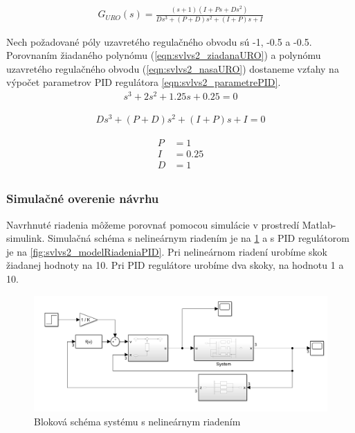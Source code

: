 \documentclass[../main.tex]{subfiles}
\begin{document}
\begin{equation}
		\begin{aligned}
		G_{URO}(s) = \frac{(s+1)(I + Ps + Ds^2)}{Ds^3+(P+D)s^2+(I+P)s+I}
		\end{aligned}
		\label{eqn:svlvs2_prenosUROSystemuLinearizovane}
\end{equation}

Nech požadované póly uzavretého regulačného obvodu sú -1, -0.5 a -0.5. Porovnaním žiadaného polynómu (\cref{eqn:svlvs2_ziadanaURO}) a polynómu uzavretého regulačného obvodu (\cref{eqn:svlvs2_nasaURO}) dostaneme vzťahy na výpočet parametrov PID regulátora \cref{eqn:svlvs2_parametrePID}.
\begin{equation}
		\begin{aligned}
		s^3+2s^2+1.25s+0.25=0
		\end{aligned}
		\label{eqn:svlvs2_ziadanaURO}
	\end{equation}

\begin{equation}
		\begin{aligned}
		Ds^3+(P+D)s^2+(I+P)s+I=0
		\end{aligned}
		\label{eqn:svlvs2_nasaURO}
	\end{equation}

\begin{equation}
		\begin{aligned}
		P &= 1 						\\
		I &= 0.25 						\\
		D &= 1						 \\
		\end{aligned}
		\label{eqn:svlvs2_parametrePID}
	\end{equation}

\newpage
\subsubsection{Simulačné overenie návrhu}

Navrhnuté riadenia môžeme porovnať pomocou simulácie v prostredí Matlab-simulink. Simulačná schéma s nelineárnym riadením je na \cref{fig:svlvs2_modelRiadenia} a s PID regulátorom je na \cref{fig:svlvs2_modelRiadeniaPID}. Pri nelineárnom riadení urobíme skok žiadanej hodnoty na 10. Pri PID regulátore urobíme dva skoky, na hodnotu 1 a 10.
	\begin{figure}[h!]
		\centering
		\includegraphics[width=0.8\linewidth]{ModelRiadenia}
		\caption{Bloková schéma systému s nelineárnym riadením}
		\label{fig:svlvs2_modelRiadenia}
	\end{figure}
\end{document}
